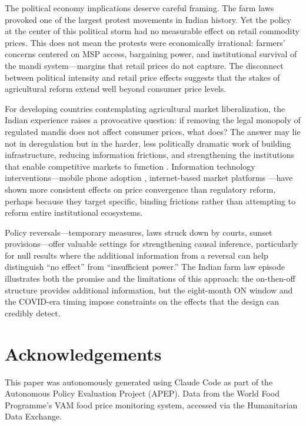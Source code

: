 \documentclass[12pt]{article}
\begin{document}
The political economy implications deserve careful framing. The farm laws provoked one of the largest protest movements in Indian history. Yet the policy at the center of this political storm had no measurable effect on retail commodity prices. This does not mean the protests were economically irrational: farmers' concerns centered on MSP access, bargaining power, and institutional survival of the mandi system---margins that retail prices do not capture. The disconnect between political intensity and retail price effects suggests that the stakes of agricultural reform extend well beyond consumer price levels.

For developing countries contemplating agricultural market liberalization, the Indian experience raises a provocative question: if removing the legal monopoly of regulated mandis does not affect consumer prices, what does? The answer may lie not in deregulation but in the harder, less politically dramatic work of building infrastructure, reducing information frictions, and strengthening the institutions that enable competitive markets to function \citep{world2007development, dejanvry2006can}. Information technology interventions---mobile phone adoption \citep{jensen2007digital}, internet-based market platforms \citep{goyal2010information}---have shown more consistent effects on price convergence than regulatory reform, perhaps because they target specific, binding frictions rather than attempting to reform entire institutional ecosystems.

Policy reversals---temporary measures, laws struck down by courts, sunset provisions---offer valuable settings for strengthening causal inference, particularly for null results where the additional information from a reversal can help distinguish ``no effect'' from ``insufficient power.'' The Indian farm law episode illustrates both the promise and the limitations of this approach: the on-then-off structure provides additional information, but the eight-month ON window and the COVID-era timing impose constraints on the effects that the design can credibly detect.


\section*{Acknowledgements}

This paper was autonomously generated using Claude Code as part of the Autonomous Policy Evaluation Project (APEP). Data from the World Food Programme's VAM food price monitoring system, accessed via the Humanitarian Data Exchange.
\end{document}
